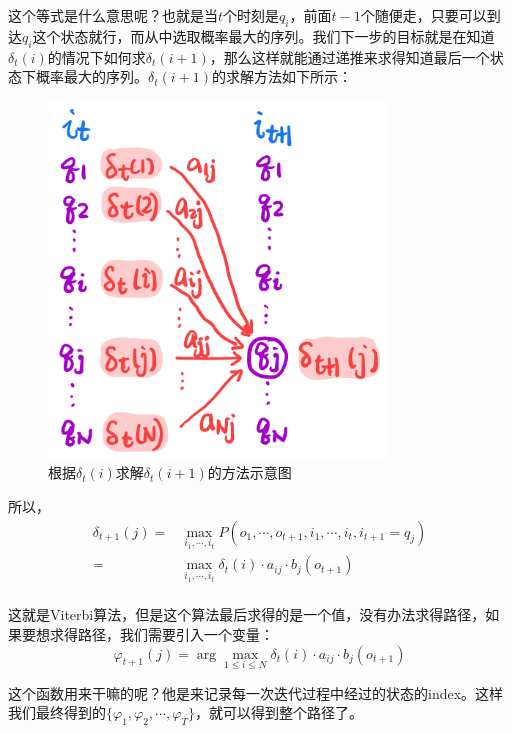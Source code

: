 \documentclass[a4paper]{article}
\begin{document}
这个等式是什么意思呢？也就是当$t$个时刻是$q_i$，前面$t-1$个随便走，只要可以到达$q_i$这个状态就行，而从中选取概率最大的序列。我们下一步的目标就是在知道$\delta_t(i)$的情况下如何求$\delta_t(i+1)$，那么这样就能通过递推来求得知道最后一个状态下概率最大的序列。$\delta_t(i+1)$的求解方法如下所示：
\begin{figure}[H]
    \centering
    \includegraphics[width=.35\textwidth]{微信图片_20200109230705.png}
    \caption{根据$\delta_t(i)$求解$\delta_t(i+1)$的方法示意图}
    \label{fig:my_label_1}
\end{figure}

所以，
\begin{equation}
\begin{split}
    \delta_{t+1}(j) 
    = & \max_{i_1,\cdots,i_{t}} P(o_1,\cdots,o_{t+1},i_1,\cdots,i_{t},i_{t+1}=q_j) \\
    = & \max_{i_1,\cdots,i_{t}} \delta_t(i)\cdot a_{ij}\cdot b_j(o_{t+1}) \\
\end{split}
\end{equation}

这就是Viterbi算法，但是这个算法最后求得的是一个值，没有办法求得路径，如果要想求得路径，我们需要引入一个变量：
\begin{equation}
    \varphi_{t+1}(j) = \arg\max_{1\leq i \leq N}\delta_t(i)\cdot a_{ij}\cdot b_j(o_{t+1})
\end{equation}

这个函数用来干嘛的呢？他是来记录每一次迭代过程中经过的状态的index。这样我们最终得到的$\{ \varphi_1,\varphi_2,\cdots,\varphi_T \}$，就可以得到整个路径了。
\end{document}
